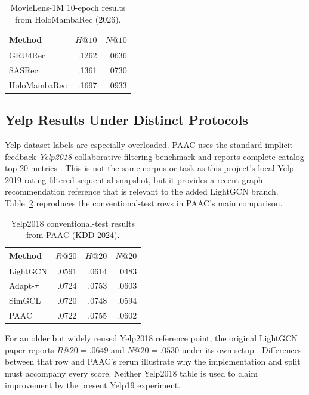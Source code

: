 \begin{table}[H]
\centering
\caption{MovieLens-1M 10-epoch results from HoloMambaRec (2026).}
\label{tab:holo-ml1m}
\begin{tabular}{@{}lrr@{}}
\toprule
Method & $H@10$ & $N@10$ \\
\midrule
GRU4Rec & .1262 & .0636 \\
SASRec & .1361 & .0730 \\
HoloMambaRec & .1697 & .0933 \\
\bottomrule
\end{tabular}
\end{table}

\subsection{Yelp Results Under Distinct Protocols}

Yelp dataset labels are especially overloaded. PAAC uses the standard
implicit-feedback \emph{Yelp2018} collaborative-filtering benchmark and reports
complete-catalog top-20 metrics \cite{PAAC}. This is not the same corpus or task
as this project's local Yelp 2019 rating-filtered sequential snapshot, but it
provides a recent graph-recommendation reference that is relevant to the added
LightGCN branch. Table~\ref{tab:paac-yelp2018} reproduces the conventional-test
rows in PAAC's main comparison.

\begin{table}[H]
\centering
\caption{Yelp2018 conventional-test results from PAAC (KDD 2024).}
\label{tab:paac-yelp2018}
\begin{tabular}{@{}lrrr@{}}
\toprule
Method & $R@20$ & $H@20$ & $N@20$ \\
\midrule
LightGCN & .0591 & .0614 & .0483 \\
Adapt-$\tau$ & .0724 & .0753 & .0603 \\
SimGCL & .0720 & .0748 & .0594 \\
PAAC & .0722 & .0755 & .0602 \\
\bottomrule
\end{tabular}
\end{table}

For an older but widely reused Yelp2018 reference point, the original
LightGCN paper reports $R@20=.0649$ and $N@20=.0530$ under its own setup
\cite{LIGHTGCN}. Differences between that row and PAAC's rerun illustrate why
the implementation and split must accompany every score. Neither Yelp2018
table is used to claim improvement by the present Yelp19 experiment.

